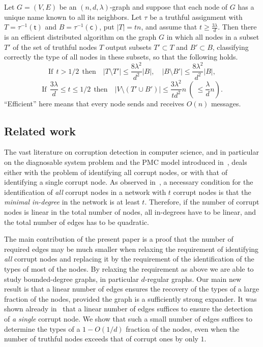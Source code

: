 \documentclass{toc}
\begin{document}
%
\begin{proposition} 
\label{p:distributed}
Let $G=(V,E)$ be an $(n,d, \lambda)$-graph and suppose that each node
of $G$ has a unique name known to all its neighbors.
Let $\tau$ be a truthful assignment with 
$T = \tau^{-1}(\mathsf{t})$ and $B =  \tau^{-1}(\mathsf{c})$,
put $|T|=tn$, and assume that
$t \geq \frac{3 \lambda}{d}$. Then there is 
an efficient  distributed algorithm on the graph $G$  in which
%
all nodes in a subset $T'$ of the set of truthful nodes $T$ output
subsets $T' \subset T$ and $B' \subset B$, classifying correctly the
type of all nodes in these subsets,  so that the following
holds.  
%
%
\begin{equation} 
\label{eq101}
\mbox{If}~~t >1/2~~ \mbox{then} \quad 
|T \setminus T'| \leq \frac{8\lambda^2}{d^2} |B| , \quad 
|B \setminus B'| \leq  \frac{8 \lambda^2}{d^2} |B|,
\end{equation}
\begin{equation} 
\label{eq102}
\mbox{If}~~\frac{3 \lambda}{d} \leq t \leq 1/2~~ \mbox{then} \quad 
|V \setminus (T' \cup B')| \leq \frac{3\lambda^2}{td^2}n
 ~(~\leq  \frac{\lambda}{d} n).
\end{equation}
%
%
%
%
%
%
%
%
%
%
``Efficient'' here means that every node sends and receives $O(n)$
messages. %
\end{proposition} 

\subsection{Related work} 

The vast literature on corruption detection in computer science,
and in particular on the diagnosable system problem and the PMC model
introduced in~\cite{PMC67},
%
deals  %
either with the problem of identifying all
corrupt nodes, or with that of identifying a single corrupt node. 
As observed in~\cite{PMC67},  a necessary condition 
for the identification of \emph{all} corrupt nodes in a network with $t$ 
corrupt nodes is that the \emph{minimal in-degree} 
in the network is at least $t$.
Therefore, if the number of corrupt nodes is linear in the total number
of nodes, all in-degrees have to be linear, and the total
number of edges has to be quadratic.

The main contribution of the present paper is 
a proof that the number of required edges may be much smaller
when relaxing the requirement of 
identifying \emph{all} corrupt nodes and replacing it by the 
requirement of the 
identification of the types
%
%
of most of the nodes.  %
By relaxing the requirement as above 
we are able to study bounded-degree graphs, in particular $d$-regular graphs. 
Our main new result is that a linear number
%
of edges ensures the recovery of the types of a large fraction
of the nodes, provided the graph is a sufficiently strong expander.
It was shown already
in~\cite{PMC67} that   a linear number of edges suffices
to ensure the detection
of \emph{a single} corrupt node. We show that such a small number of
edges suffices to determine the types of a $1-O(1/d)$ fraction of the 
nodes, even when the number of truthful nodes exceeds that of
corrupt ones by only $1$.
\end{document}
